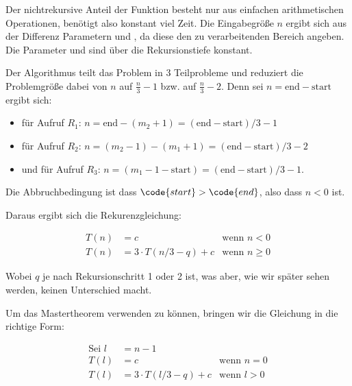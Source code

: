 \documentclass[parskip=half,a4paper]{scrartcl}
\begin{document}
Der nichtrekursive Anteil der Funktion besteht nur aus einfachen arithmetischen Operationen, benötigt also konstant  viel Zeit. Die Eingabegröße $n$ ergibt sich aus der Differenz Parametern  und , da diese den zu verarbeitenden Bereich angeben. Die Parameter  und  sind über die Rekursionstiefe konstant.

Der Algorithmus teilt das Problem in 3 Teilprobleme und reduziert die Problemgröße dabei von $n$ auf $\frac{n}{3} - 1$ bzw. auf $\frac{n}{3} - 2$. Denn sei $n = \text{end} - \text{start}$ ergibt sich:
\begin{itemize}
	\item für Aufruf $R_1$: $n = \text{end} - \left(m_2 + 1\right) = \left(\text{end} -
	\text{start}\right) / 3 - 1$

	\item für Aufruf $R_2$: $n = \left(m_2 - 1\right) - \left(m_1 + 1\right) = \left(\text{end} - \text{start}\right) / 3 - 2$
	\item und für Aufruf $R_3$: $n = \left(m_1 - 1 - \text{start}\right) = \left(\text{end} - \text{start}\right) / 3 - 1$.
\end{itemize}

Die Abbruchbedingung ist dass $\code{start} > \code{end}$, also dass $n < 0$ ist.

Daraus ergibt sich die Rekurenzgleichung:

\begin{equation*}
\begin{aligned}
T\left(n\right) & = c & \text{wenn $n < 0$}  \\
T\left(n\right) & = 3 \cdot T\left(n / 3 - q\right) + c & \text{wenn $n \ge 0$}
\end{aligned}
\end{equation*}

Wobei $q$ je nach Rekursionschritt 1 oder 2 ist, was aber, wie wir später sehen werden, keinen Unterschied macht.

Um das Mastertheorem verwenden zu können, bringen wir die Gleichung in die richtige Form:


\begin{equation*}
\begin{aligned}
\text{Sei $l$} & = n - 1&\\
T\left(l\right) & = c & \text{wenn $n = 0$}  \\
T\left(l\right) & = 3 \cdot T\left(l / 3 - q\right) + c & \text{wenn $l > 0$}
\end{aligned}
\end{equation*}
\end{document}
